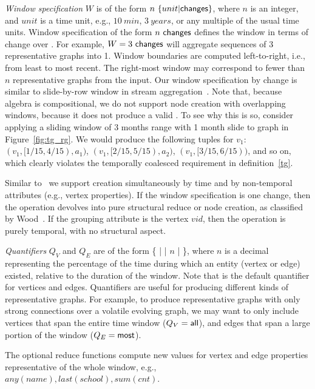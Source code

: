 {\em Window specification} $W$ is of the form
$n~\{unit|\textsf{changes}\}$, where $n$ is an integer, and $unit$ is a
time unit, e.g., $10~min$, $3~years$, or any multiple of the usual
time units.  Window specification of the form $n~\textsf{changes}$
defines the window in terms of change over \trg.  For example,
$W=3~\textsf{changes}$ will aggregate sequences of 3 representative
graphs into 1.  Window boundaries are computed left-to-right, i.e.,
from least to most recent.  The right-most window may correspond to
fewer than $n$ representative graphs from the input.
%
Our window specification by change is similar to slide-by-row window
in stream aggregation~\cite{Li2005}.  Note that, because \tg algebra
is compositional, we do not support node creation with overlapping
windows, because it does not produce a valid \tg.  To see why this is
so, consider applying a sliding window of 3 months range with 1 month
slide to graph  in Figure~\ref{fig:tg_rg}.  We would produce
the following tuples for $v_1$: $(v_1, [1/15, 4/15), a_1)$, $(v_1,
  [2/15, 5/15), a_2)$, $(v_1, [3/15, 6/15))$, and so on, which clearly
      violates the temporally coalesced requirement in
      definition~\ref{tg}.

Similar to~\cite{Li2005} we support creation simultaneously by time
and by non-temporal attributes (e.g., vertex properties).  If the
window specification is one change, then the operation devolves into
pure structural reduce or node creation, as classified by
Wood~\cite{Wood2012}.  If the grouping attribute is the vertex $vid$,
then the operation is purely temporal, with no structural aspect.

{\em Quantifiers} $Q_V$ and $Q_E$ are of the form \{  |
 |  $n$ |  \}, where $n$ is
a decimal representing the percentage of the time during which an
entity (vertex or edge) existed, relative to the duration of the
window. Note that  is the default quantifier for
vertices and edges.  Quantifiers are useful for producing different
kinds of representative graphs.  For example, to produce
representative graphs with only strong connections over a volatile
evolving graph, we may want to only include vertices that span the
entire time window ($Q_V=\textsf{all}$), and edges that span a large
portion of the window ($Q_E=\textsf{most}$).
 
The optional reduce functions compute new
values for vertex and edge properties representative of
the whole window, e.g., $any(name), last(school), sum(cnt)$.
%
 
